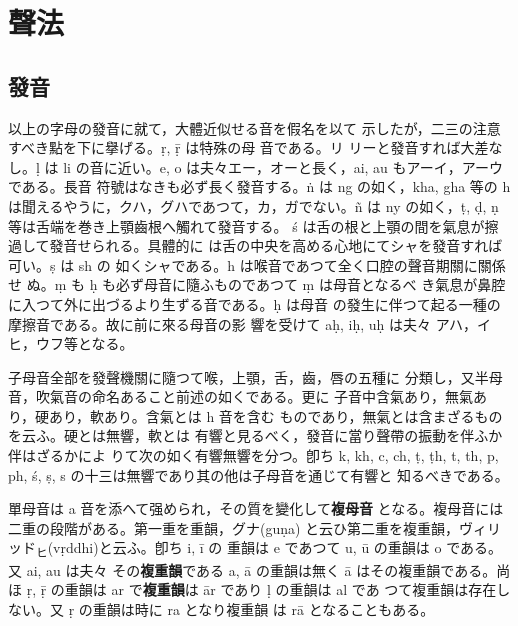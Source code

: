 \chapter{聲法}
\label{cha:pronunciation}

\section{發音}
\numberParagraph
以上の字母の發音に就て，大體近似せる音を假名を以て
示したが，二三の注意すべき點を下に擧げる。ṛ, ṝ は特殊の母
音である。リ リーと發音すれば大差なし。ḷ は li の音に近い。e,
o は夫々エー，オーと長く，ai, au もアーイ，アーウである。長音
符號はなきも必ず長く發音する。ṅ は ng の如く，kha, gha
等の h は聞えるやうに，クハ，グハであつて，カ，ガでない。ñ は
ny の如く，ṭ, ḍ, ṇ 等は舌端を巻き上顎齒根へ觸れて發音する。
ś は舌の根と上顎の間を氣息が擦過して發音せられる。具體的に
は舌の中央を高める心地にてシャを發音すれば可い。ṣ は sh の
如くシャである。h は喉音であつて全く口腔の聲音期關に關係せ
ぬ。ṃ も ḥ も必ず母音に隨ふものであつて ṃ は母音となるべ
き氣息が鼻腔に入つて外に出づるより生ずる音である。ḥ は母音
の發生に伴つて起る一種の摩擦音である。故に前に來る母音の影
響を受けて aḥ, iḥ, uḥ は夫々 アハ，イヒ，ウフ等となる。

\numberParagraph
子母音全部を發聲機關に隨つて喉，上顎，舌，齒，唇の五種に
分類し，又半母音，吹氣音の命名あること前述の如くである。更に
子音中含氣あり，無氣あり，硬あり，軟あり。含氣とは h 音を含む
ものであり，無氣とは含まざるものを云ふ。硬とは無響，軟とは
有響と見るべく，發音に當り聲帶の振動を伴ふか伴はざるかによ
りて次の如く有響無響を分つ。卽ち k, kh, c, ch, ṭ, ṭh, t, th, p,
ph, ś, ṣ, s の十三は無響であり其の他は子母音を通じて有響と
知るべきである。

\numberParagraph
單母音は a 音を添へて强められ，その質を變化して\textbf{複母音}
となる。複母音には二重の段階がある。第一重を重韻，グナ(guṇa)
と云ひ第二重を複重韻，ヴィリッド\textsubscript{ヒ}(vṛddhi)と云ふ。卽ち i, ī の
重韻は e であつて u, ū の重韻は o である。又 ai, au は夫々
その\textbf{複重韻}である a, ā の重韻は無く ā はその複重韻である。尚
ほ ṛ, ṝ の重韻は ar で\textbf{複重韻}は ār であり ḷ の重韻は al であ
つて複重韻は存在しない。又 ṛ の重韻は時に ra となり複重韻
は rā となることもある。

\begin{center}
\end{center}


